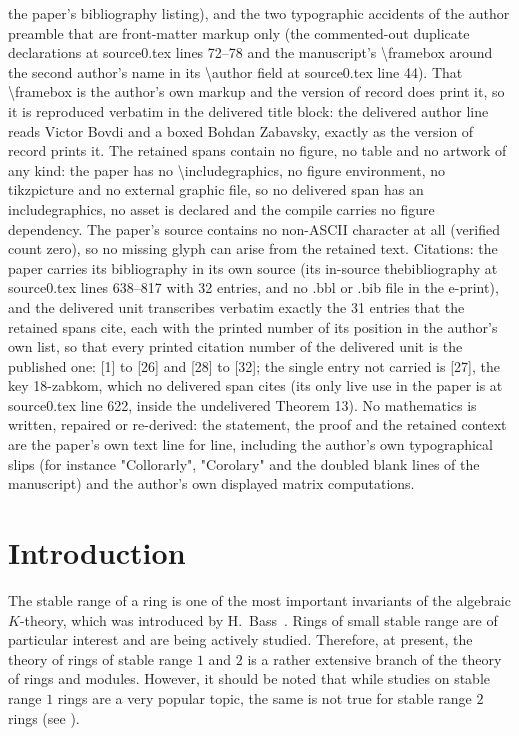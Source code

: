\documentclass[10pt,a4paper]{amsart}
\theoremstyle{plain}
\theoremstyle{definition}
\begin{document}
the paper's bibliography listing), and the two typographic accidents of the author preamble that are front-matter markup only (the commented-out duplicate declarations at source0.tex lines 72--78 and the manuscript's \textbackslash{}framebox around the second author's name in its \textbackslash{}author field at source0.tex line 44). That \textbackslash{}framebox is the author's own markup and the version of record does print it, so it is reproduced verbatim in the delivered title block: the delivered author line reads Victor Bovdi and a boxed Bohdan Zabavsky, exactly as the version of record prints it. The retained spans contain no figure, no table and no artwork of any kind: the paper has no \textbackslash{}includegraphics, no figure environment, no tikzpicture and no external graphic file, so no delivered span has an includegraphics, no asset is declared and the compile carries no figure dependency. The paper's source contains no non-ASCII character at all (verified count zero), so no missing glyph can arise from the retained text. Citations: the paper carries its bibliography in its own source (its in-source thebibliography at source0.tex lines 638--817 with 32 entries, and no .bbl or .bib file in the e-print), and the delivered unit transcribes verbatim exactly the 31 entries that the retained spans cite, each with the printed number of its position in the author's own list, so that every printed citation number of the delivered unit is the published one: [1] to [26] and [28] to [32]; the single entry not carried is [27], the key 18-zabkom, which no delivered span cites (its only live use in the paper is at source0.tex line 622, inside the undelivered Theorem 13). No mathematics is written, repaired or re-derived: the statement, the proof and the retained context are the paper's own text line for line, including the author's own typographical slips (for instance "Collorarly", "Corolary" and the doubled blank lines of the manuscript) and the author's own displayed matrix computations.
\section{Introduction}
The stable range  of a ring is one of the most important invariants of the algebraic $K$-theory,
which  was introduced by H.~Bass~\cite{1-bass}. Rings of small stable range  are of particular interest and are being actively studied. Therefore, at present, the theory of rings of stable range  $1$ and $2$ is a rather extensive branch of the theory of rings and modules. However, it should be noted that while studies on stable range $1$ rings are a very popular topic, the same is not true for stable range $2$ rings (see \cite[p.\,2]{3-zabavsky}).
\end{document}

